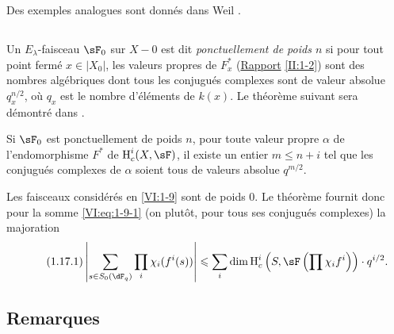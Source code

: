 Des exemples analogues sont donn\'es dans Weil \cite[App V]{we74}. 





\subsection{}\label{VI:1-16}

Un $E_\lambda$-faisceau $\sF_0$ sur $X-0$ est dit \emph{ponctuellement de 
poids $n$} si pour tout point ferm\'e $x\in |X_0|$, les valeurs propres de 
$F_x^\ast$ (\hyperref[II]{Rapport} \ref{II:1-2}) sont des nombres alg\'ebriques 
dont tous les conjugu\'es complexes sont de valeur absolue 
$q_x^{n/2}$, o\`u $q_x$ est le nombre d'\'el\'ements de $k(x)$. Le th\'eor\`eme 
suivant sera d\'emontr\'e dans \cite{de80}. 





\begin{theorem_}\label{VI:1-17}
Si $\sF_0$ est ponctuellement de poids $n$, pour toute valeur propre $\alpha$ 
de l'endomorphisme $F^\ast$ de $\h_c^i(X,\sF)$, il existe un entier 
$m\leqslant n+i$ tel que les conjugu\'es complexes de $\alpha$ soient tous de 
valeurs absolue $q^{m/2}$.
\end{theorem_}

Les faisceaux consid\'er\'es en \ref{VI:1-9} sont de poids $0$. Le th\'eor\`eme 
fournit donc pour la somme \ref{VI:eq:1-9-1} (on plut\^ot, pour tous ses 
conjugu\'es complexes) la majoration 
\begin{equation*}\tag{1.17.1}\label{VI:eq:1-17-1}
  \left|\sum_{s\in S_0(\dF_q)} \prod_i \chi_i(f^i(s)) \right| \leqslant \sum_i \dim \h_c^i\left(S,\sF\left(\prod \chi_i f^i\right)\right)\cdot q^{i/2} \text{.}
\end{equation*}





\subsection{Remarques}\label{VI:1-18}

